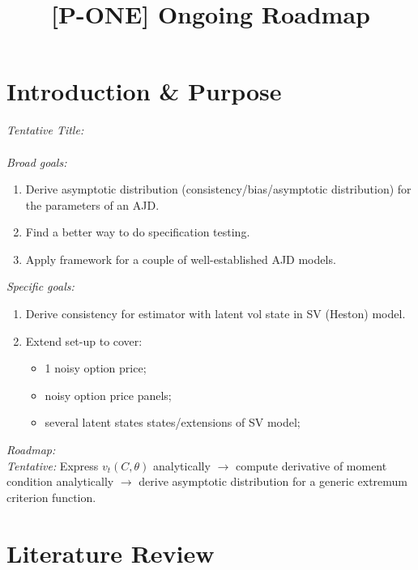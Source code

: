 \documentclass[11pt,a4paper,notitlepage]{article}
\author{ %
	    }
\title{\Large \textbf{[P-ONE] Ongoing Roadmap\vspace*{-25pt}}
}
\numberwithin{equation}{section}
\begin{document}
\maketitle
\tableofcontents

\onehalfspacing
\newpage
\section{Introduction \& Purpose}
\emph{Tentative Title:}\\
{}\\

\noindent\emph{Broad goals:}
\begin{enumerate} 
	\item Derive asymptotic distribution (consistency/bias/asymptotic distribution) for the parameters of an AJD.
	\item Find a better way to do specification testing.
	\item Apply framework for a couple of well-established AJD models.\\
\end{enumerate}

\noindent\emph{Specific goals:}
\begin{enumerate}
	\item Derive consistency for estimator with latent vol state in SV (Heston) model.
	\item Extend set-up to cover:
	\begin{itemize}
		\item 1 noisy option price;
		\item noisy option price panels;
		\item several latent states states/extensions of SV model;\\
	\end{itemize}
\end{enumerate}

\noindent\emph{Roadmap:}\\
\emph{Tentative:} Express $v_t(C,\theta)$ analytically $\longrightarrow$ compute derivative of moment condition analytically $\longrightarrow$ derive asymptotic distribution for a generic extremum criterion function. 

\newpage
\section{Literature Review}
\end{document}

